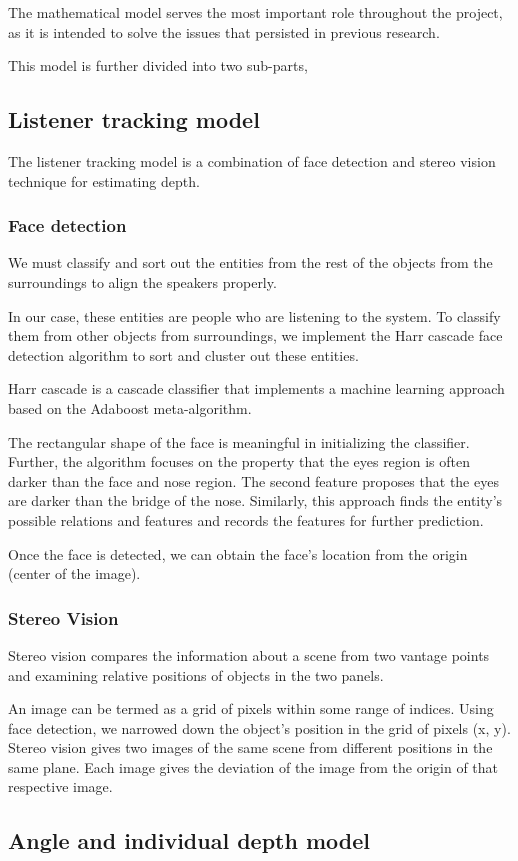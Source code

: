 \documentclass[twocolumn]{report}
\begin{document}
The mathematical model serves the most important role throughout the project, as it is 
intended to solve the issues that persisted in previous research. 

This model is further divided into two sub-parts,

\subsection{Listener tracking model}

The listener tracking model is a combination of face detection and stereo vision 
technique for estimating depth.

\subsubsection{Face detection}

We must classify and sort out the entities from the rest of the objects from the 
surroundings to align the speakers properly.

In our case, these entities are people who are listening to the system. To classify 
them from other objects from surroundings, we implement the Harr cascade face detection 
algorithm to sort and cluster out these entities.

Harr cascade is a cascade classifier that implements a machine learning approach based 
on the Adaboost meta-algorithm.

The rectangular shape of the face is meaningful in initializing the classifier. Further, 
the algorithm focuses on the property that the eyes region is often darker than the face 
and nose region. The second feature proposes that the eyes are darker than the bridge of 
the nose. Similarly, this approach finds the entity's possible relations and features 
and records the features for further prediction. 

Once the face is detected, we can obtain the face's location from the origin (center of 
the image).

\subsubsection{Stereo Vision}

Stereo vision compares the information about a scene from two vantage points and 
examining relative positions of objects in the two panels.

An image can be termed as a grid of pixels within some range of indices. Using face 
detection, we narrowed down the object's position in the grid of pixels (x, y). 
Stereo vision gives two images of the same scene from different positions in the same 
plane. Each image gives the deviation of the image from the origin of that respective 
image.

\subsection{Angle and individual depth model}
\end{document}
